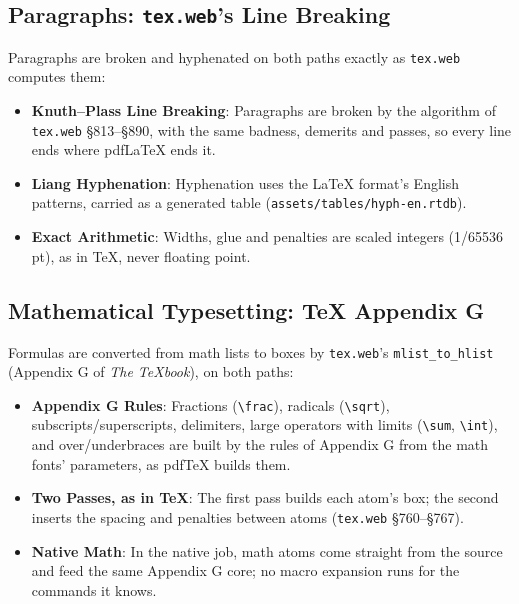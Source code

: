 \documentclass[11pt, a4paper]{article}
\begin{document}
\subsection{Paragraphs: \texttt{tex.web}'s Line Breaking}
Paragraphs are broken and hyphenated on both paths exactly as \texttt{tex.web} computes them:
\begin{itemize}
\item \textbf{Knuth--Plass Line Breaking}: Paragraphs are broken by the algorithm of \texttt{tex.web} \S813--\S890, with the same badness, demerits and passes, so every line ends where pdfLaTeX ends it.
\item \textbf{Liang Hyphenation}: Hyphenation uses the LaTeX format's English patterns, carried as a generated table (\texttt{assets/tables/hyph-en.rtdb}).
\item \textbf{Exact Arithmetic}: Widths, glue and penalties are scaled integers (1/65536 pt), as in TeX, never floating point.
\end{itemize}

\subsection{Mathematical Typesetting: TeX Appendix G}
Formulas are converted from math lists to boxes by \texttt{tex.web}'s \texttt{mlist\_to\_hlist} (Appendix G of \emph{The TeXbook}), on both paths:
\begin{itemize}
\item \textbf{Appendix G Rules}: Fractions (\texttt{\textbackslash frac}), radicals (\texttt{\textbackslash sqrt}), subscripts/superscripts, delimiters, large operators with limits (\texttt{\textbackslash sum}, \texttt{\textbackslash int}), and over/underbraces are built by the rules of Appendix G from the math fonts' parameters, as pdfTeX builds them.
\item \textbf{Two Passes, as in TeX}: The first pass builds each atom's box; the second inserts the spacing and penalties between atoms (\texttt{tex.web} \S760--\S767).
\item \textbf{Native Math}: In the native job, math atoms come straight from the source and feed the same Appendix G core; no macro expansion runs for the commands it knows.
\end{itemize}
\end{document}
